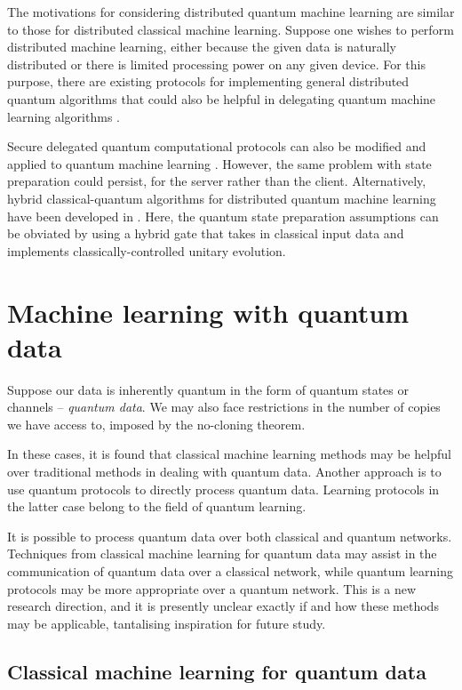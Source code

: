 \documentclass[twocolumn, aps, rmp, amsmath, amssymb, nofootinbib, superscriptaddress, longbibliography, floatfix, table-of-contents, eqsecnum]{revtex4}
\begin{document}
The motivations for considering distributed quantum machine learning are similar to those for distributed classical machine learning. Suppose one wishes to perform distributed machine learning, either because the given data is naturally distributed or there is limited processing power on any given device. For this purpose, there are existing protocols for implementing general distributed quantum algorithms that could also be helpful in delegating quantum machine learning algorithms \cite{bib:beals2013efficient}.

Secure delegated quantum computational protocols \cite{bib:joe} can also be modified and applied to quantum machine learning \cite{bib:sheng2017distributed, bib:bang2015protocol}. However, the same problem with state preparation could persist, for the server rather than the client. Alternatively, hybrid classical-quantum algorithms for distributed quantum machine learning have been developed in \cite{bib:yoo2014quantum}. Here, the quantum state preparation assumptions can be obviated by using a hybrid gate that takes in classical input data and implements classically-controlled unitary evolution.

\section{Machine learning with quantum data} \label{sec:ml_quantum_data}

Suppose our data is inherently quantum in the form of quantum states or channels -- \textit{quantum data}. We may also face restrictions in the number of copies we have access to, imposed by the no-cloning theorem.

In these cases, it is found that classical machine learning methods may be helpful over traditional methods in dealing with quantum data. Another approach is to use quantum protocols to directly process quantum data. Learning protocols in the latter case belong to the field of quantum learning.

It is possible to process quantum data over both classical and quantum networks. Techniques from classical machine learning for quantum data may assist in the communication of quantum data over a classical network, while quantum learning protocols may be more appropriate over a quantum network. This is a new research direction, and it is presently unclear exactly if and how these methods may be applicable, tantalising inspiration for future study.

\subsection{Classical machine learning for quantum data}
\end{document}
